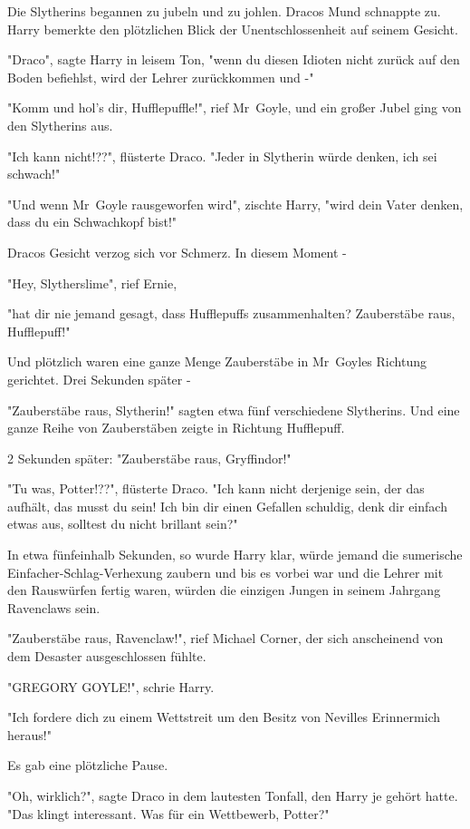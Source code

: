 {Die Slytherins begannen zu jubeln und zu johlen. Dracos Mund schnappte zu. Harry bemerkte den plötzlichen Blick der Unentschlossenheit auf seinem Gesicht.

"Draco", sagte Harry in leisem Ton, "wenn du diesen Idioten nicht zurück auf den Boden befiehlst, wird der Lehrer zurückkommen und -"

"Komm und hol's dir, Hufflepuffle!", rief Mr~Goyle, und ein großer Jubel ging von den Slytherins aus.

"Ich kann nicht!??", flüsterte Draco. "Jeder in Slytherin würde denken, ich sei schwach!"

"Und wenn Mr~Goyle rausgeworfen wird", zischte Harry, "wird dein Vater denken, dass du ein Schwachkopf bist!"

Dracos Gesicht verzog sich vor Schmerz. In diesem Moment -

"Hey, Slytherslime", rief Ernie,

"hat dir nie jemand gesagt, dass Hufflepuffs zusammenhalten? Zauberstäbe raus, Hufflepuff!"

Und plötzlich waren eine ganze Menge Zauberstäbe in Mr~Goyles Richtung gerichtet. Drei Sekunden später -

"Zauberstäbe raus, Slytherin!" sagten etwa fünf verschiedene Slytherins. Und eine ganze Reihe von Zauberstäben zeigte in Richtung Hufflepuff.

2 Sekunden später: "Zauberstäbe raus, Gryffindor!"

"Tu was, Potter!??", flüsterte Draco. "Ich kann nicht derjenige sein, der das aufhält, das musst du sein! Ich bin dir einen Gefallen schuldig, denk dir einfach etwas aus, solltest du nicht brillant sein?"

In etwa fünfeinhalb Sekunden, so wurde Harry klar, würde jemand die sumerische Einfacher-Schlag-Verhexung zaubern und bis es vorbei war und die Lehrer mit den Rauswürfen fertig waren, würden die einzigen Jungen in seinem Jahrgang Ravenclaws sein.

"Zauberstäbe raus, Ravenclaw!", rief Michael Corner, der sich anscheinend von dem Desaster ausgeschlossen fühlte.

"GREGORY GOYLE!", schrie Harry.

"Ich fordere dich zu einem Wettstreit um den Besitz von Nevilles Erinnermich heraus!"

Es gab eine plötzliche Pause.

"Oh, wirklich?", sagte Draco in dem lautesten Tonfall, den Harry je gehört hatte. "Das klingt interessant. Was für ein Wettbewerb, Potter?"

}
